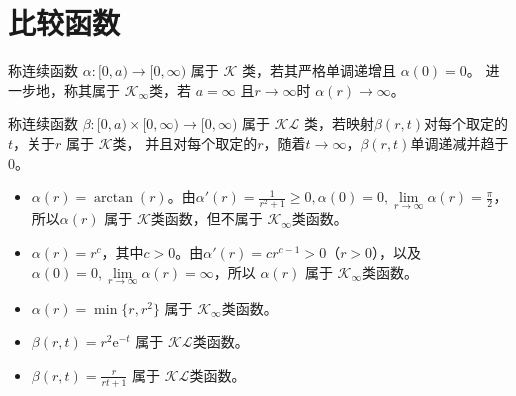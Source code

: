 \section{比较函数}\label{3Aref}

\begin{definition}
  称连续函数 $\alpha : [0, a) \rightarrow [0, \infty)$ 属于 $\mathcal{K}$ 类，若其严格单调递增且 $\alpha (0) =0$。
  进一步地，称其属于 $\mathcal{K}_{\infty}$类，若 $a = \infty$ 且$r \rightarrow \infty$时
  $\alpha (r) \rightarrow \infty$。
\end{definition}

\begin{definition}
  称连续函数 $\beta : [0, a) \times [0, \infty) \rightarrow [0,
  \infty)$ 属于 $\mathcal{K}\mathcal{L}$ 类，若映射$\beta (r, t)$对每个取定的$t$，关于$r$ 属于 $\mathcal{K}$类，
  并且对每个取定的$r$，随着$t
  \rightarrow \infty$，$\beta (r, t)$单调递减并趋于$ 0$。
\end{definition}

\begin{example}  
  \begin{itemize}[leftmargin=1em]
    \item $\alpha (r) = \arctan (r)$。由$\alpha' (r) = \frac{1}{r^2 + 1} \geq 0,
    \alpha (0) = 0, \lim\limits_{r \rightarrow \infty} \alpha (r) = \frac{\pi}{2}$，
    所以$\alpha (r)$ 属于 $\mathcal{K}$类函数，但不属于 $\mathcal{K}_{\infty}$类函数。
    
    \item $\alpha (r) = r^c$，其中$c>0$。由$\alpha' (r) = c r^{c-1}>0$（$r>0$），以及$\alpha (0) = 0, \lim\limits_{r
    \rightarrow \infty} \alpha (r) = \infty$，所以 $\alpha (r)$ 属于 $\mathcal{K}_{\infty}$类函数。
    
    \item $\alpha (r) = \min \{ r, r^2 \}$ 属于 $\mathcal{K}_{\infty}$类函数。
    
    \item $\beta (r, t) = r^2 \mathrm{e}^{- t}$ 属于    $\mathcal{K}\mathcal{L}$类函数。
    \item $\beta (r, t) = \frac{r}{rt+1}$ 属于 $\mathcal{K}\mathcal{L}$类函数。
  \end{itemize}
\end{example}

